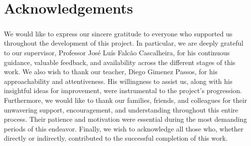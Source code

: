 \chapter*{Acknowledgements}

\paragraph{}We would like to express our sincere gratitude to everyone who supported us throughout the development of this project. In particular, we are deeply grateful to our supervisor, Professor José Luís Falcão Cascalheira, for his continuous guidance, valuable feedback, and availability across the different stages of this work.
We also wish to thank our teacher, Diego Gimenez Passos, for his approachability and attentiveness. His willingness to assist us, along with his insightful ideas for improvement, were instrumental to the project's progression.
Furthermore, we would like to thank our families, friends, and colleagues for their unwavering support, encouragement, and understanding throughout this entire process. Their patience and motivation were essential during the most demanding periods of this endeavor.
Finally, we wish to acknowledge all those who, whether directly or indirectly, contributed to the successful completion of this work.